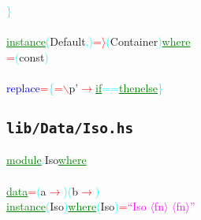 \textcolor{cyan}{\}}\\\\\textcolor{green}{\underline{instance}}\hsspace \textcolor{cyan}{(}{\rm{}Default}\textcolor{cyan}{,}\textcolor{cyan}{)}\hsspace \textcolor{red}{=\ensuremath{\rangle}}\hsspace \textcolor{cyan}{(}{\rm{}Container}\textcolor{cyan}{)}\hsspace \textcolor{green}{\underline{where}}\\\hsspace \textcolor{red}{=}\hsspace \textcolor{cyan}{(}{\rm{}const}\textcolor{cyan}{)}\\\\\textcolor{blue}{replace}\hsspace \textcolor{red}{=}\hsspace \textcolor{cyan}{\{}\hsspace \textcolor{red}{=}\hsspace \textcolor{red}{$\backslash$}{\rm{}p'}\hsspace \textcolor{red}{\ensuremath{\rightarrow}}\hsspace \textcolor{green}{\underline{if}}\hsspace \textcolor{cyan}{==}\hsspace \textcolor{green}{\underline{then}}\hsspace \textcolor{green}{\underline{else}}\hsspace \textcolor{cyan}{\}}\\
\subsection{\texttt{lib/Data/Iso.hs}}
\label{mod:Data.Iso}
\textcolor{green}{\underline{module}}\textcolor{cyan}{.}{\rm{}Iso}\hsspace \textcolor{green}{\underline{where}}\\\\\textcolor{green}{\underline{data}}\hsspace \textcolor{red}{=}\hsspace \textcolor{cyan}{(}{\rm{}a}\hsspace \textcolor{red}{\ensuremath{\rightarrow}}\textcolor{cyan}{)}\hsspace \textcolor{cyan}{(}{\rm{}b}\hsspace \textcolor{red}{\ensuremath{\rightarrow}}\textcolor{cyan}{)}\\\textcolor{green}{\underline{instance}}\hsspace \textcolor{cyan}{(}{\rm{}Iso}\textcolor{cyan}{)}\hsspace \textcolor{green}{\underline{where}}\hsspace \textcolor{cyan}{(}{\rm{}Iso}\textcolor{cyan}{)}\hsspace \textcolor{red}{=}\hsspace \textcolor{magenta}{``Iso \ensuremath{\langle}fn\ensuremath{\rangle} \ensuremath{\langle}fn\ensuremath{\rangle}''}\\
